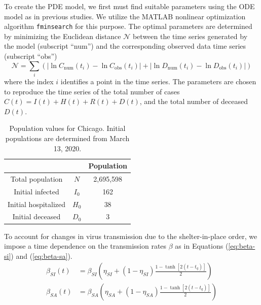 \documentclass[11pt]{article}
\begin{document}
	To create the PDE model, we first must find suitable parameters using the ODE model as in previous studies.
	We utilize the MATLAB nonlinear optimization algorithm \verb|fminsearch| for this purpose.
	The optimal parameters are determined by minimizing the Euclidean distance $\mathcal{N}$ between the time series generated by the model (subscript ``num'') and the corresponding observed data time series (subscript ``obs'')
	\begin{equation} \label{eq:objfun}
		\mathcal{N} = \sum_i \left( \left| \ln C_\mathrm{num} (t_i) - \ln C_\mathrm{obs} (t_i) \right| + \left| \ln D_\mathrm{num} (t_i) - \ln D_\mathrm{obs} (t_i) \right| \right)
	\end{equation}
	where the index $i$ identifies a point in the time series.
	The parameters are chosen to reproduce the time series of the total number of cases $C(t) = I(t) + H(t) + R(t) + D(t)$, and the total number of deceased $D(t)$.
	
	\begin{table}[h]
		\centering
		\caption{Population values for Chicago.
			Initial populations are determined from March 13, 2020.}
		\label{tab:populations}
		\begin{tabular}{ c c c }
			\hline
			\hline
			&	&	Population \\
			\hline
			Total population		&	$N$		&	2,695,598 \\
			Initial infected		&	$I_0$	&	162	\\
			Initial hospitalized	&	$H_0$	&	38 \\
			Initial deceased		&	$D_0$	&	3 \\
			\hline
			\hline
		\end{tabular}
	\end{table}

	To account for changes in virus transmission due to the shelter-in-place order, we impose a time dependence on the transmission rates $\beta$ as in Equations (\ref{eq:beta-si}) and (\ref{eq:beta-sa}).
	\begin{align}
		\label{eq:beta-si}
		\beta_{SI} (t) &= \beta_{SI} \left( \eta_{SI} + (1 - \eta_{SI}) \frac{1 - \tanh [2(t - t_q)]}{2} \right) \\
		\label{eq:beta-sa}
		\beta_{SA} (t) &= \beta_{SA} \left( \eta_{SA} + (1 - \eta_{SA}) \frac{1 - \tanh [2(t - t_q)]}{2} \right)
	\end{align}
	
\end{document}
